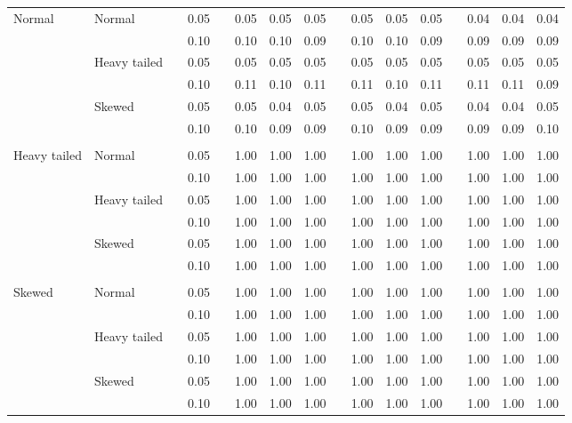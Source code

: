 \begin{table}[ht]
\begin{scriptsize}
\begin{tabular}{ll p{.1cm} c p{.1cm} rrr p{.1cm} rrr p{.1cm} rrr}
\rowcolor{gray!20} Normal       & Normal       && 0.05 &&  0.05 & 0.05 & 0.05 && 0.05 & 0.05 & 0.05 && 0.04 & 0.04 & 0.04 \\ 
\rowcolor{gray!20}              &              && 0.10 &&  0.10 & 0.10 & 0.09 && 0.10 & 0.10 & 0.09 && 0.09 & 0.09 & 0.09 \\ 
\rowcolor{gray!20}              & Heavy tailed && 0.05 &&  0.05 & 0.05 & 0.05 && 0.05 & 0.05 & 0.05 && 0.05 & 0.05 & 0.05 \\ 
\rowcolor{gray!20}              &              && 0.10 &&  0.11 & 0.10 & 0.11 && 0.11 & 0.10 & 0.11 && 0.11 & 0.11 & 0.09 \\ 
\rowcolor{gray!20}              & Skewed       && 0.05 &&  0.05 & 0.04 & 0.05 && 0.05 & 0.04 & 0.05 && 0.04 & 0.04 & 0.05 \\ 
\rowcolor{gray!20}              &              && 0.10 &&  0.10 & 0.09 & 0.09 && 0.10 & 0.09 & 0.09 && 0.09 & 0.09 & 0.10 \\
              &&&&&&&&&&&&&&&\\  
 Heavy tailed & Normal       && 0.05 &&  1.00 & 1.00 & 1.00 && 1.00 & 1.00 & 1.00 && 1.00 & 1.00 & 1.00 \\ 
              &              && 0.10 &&  1.00 & 1.00 & 1.00 && 1.00 & 1.00 & 1.00 && 1.00 & 1.00 & 1.00 \\ 
              & Heavy tailed && 0.05 &&  1.00 & 1.00 & 1.00 && 1.00 & 1.00 & 1.00 && 1.00 & 1.00 & 1.00 \\ 
              &              && 0.10 &&  1.00 & 1.00 & 1.00 && 1.00 & 1.00 & 1.00 && 1.00 & 1.00 & 1.00 \\ 
              & Skewed       && 0.05 &&  1.00 & 1.00 & 1.00 && 1.00 & 1.00 & 1.00 && 1.00 & 1.00 & 1.00 \\ 
              &              && 0.10 &&  1.00 & 1.00 & 1.00 && 1.00 & 1.00 & 1.00 && 1.00 & 1.00 & 1.00 \\ 
              &&&&&&&&&&&&&&&\\ 
 Skewed       & Normal       && 0.05 &&  1.00 & 1.00 & 1.00 && 1.00 & 1.00 & 1.00 && 1.00 & 1.00 & 1.00 \\ 
              &              && 0.10 &&  1.00 & 1.00 & 1.00 && 1.00 & 1.00 & 1.00 && 1.00 & 1.00 & 1.00 \\ 
              & Heavy tailed && 0.05 &&  1.00 & 1.00 & 1.00 && 1.00 & 1.00 & 1.00 && 1.00 & 1.00 & 1.00 \\ 
              &              && 0.10 &&  1.00 & 1.00 & 1.00 && 1.00 & 1.00 & 1.00 && 1.00 & 1.00 & 1.00 \\ 
              & Skewed       && 0.05 &&  1.00 & 1.00 & 1.00 && 1.00 & 1.00 & 1.00 && 1.00 & 1.00 & 1.00 \\ 
              &              && 0.10 &&  1.00 & 1.00 & 1.00 && 1.00 & 1.00 & 1.00 && 1.00 & 1.00 & 1.00 \\ 


\end{tabular}
\end{scriptsize}
\end{table}
